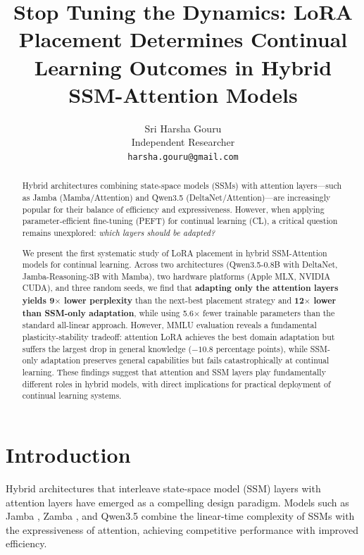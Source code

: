 \documentclass{article}
\title{Stop Tuning the Dynamics: LoRA Placement Determines Continual Learning Outcomes in Hybrid SSM-Attention Models}
\author{
  Sri Harsha Gouru \\
  Independent Researcher \\
  \texttt{harsha.gouru@gmail.com}
}
\begin{document}
\maketitle

\begin{abstract}
Hybrid architectures combining state-space models (SSMs) with attention layers---such as Jamba (Mamba/Attention) and Qwen3.5 (DeltaNet/Attention)---are increasingly popular for their balance of efficiency and expressiveness. However, when applying parameter-efficient fine-tuning (PEFT) for continual learning (CL), a critical question remains unexplored: \emph{which layers should be adapted?}

We present the first systematic study of LoRA placement in hybrid SSM-Attention models for continual learning. Across two architectures (Qwen3.5-0.8B with DeltaNet, Jamba-Reasoning-3B with Mamba), two hardware platforms (Apple MLX, NVIDIA CUDA), and three random seeds, we find that \textbf{adapting only the attention layers yields 9$\times$ lower perplexity} than the next-best placement strategy and \textbf{12$\times$ lower than SSM-only adaptation}, while using 5.6$\times$ fewer trainable parameters than the standard all-linear approach. However, MMLU evaluation reveals a fundamental plasticity-stability tradeoff: attention LoRA achieves the best domain adaptation but suffers the largest drop in general knowledge ($-10.8$ percentage points), while SSM-only adaptation preserves general capabilities but fails catastrophically at continual learning. These findings suggest that attention and SSM layers play fundamentally different roles in hybrid models, with direct implications for practical deployment of continual learning systems.
\end{abstract}

\section{Introduction}

Hybrid architectures that interleave state-space model (SSM) layers with attention layers have emerged as a compelling design paradigm. Models such as Jamba \cite{jamba2024}, Zamba \cite{zamba2024}, and Qwen3.5 \cite{qwen2025} combine the linear-time complexity of SSMs with the expressiveness of attention, achieving competitive performance with improved efficiency.
\end{document}
